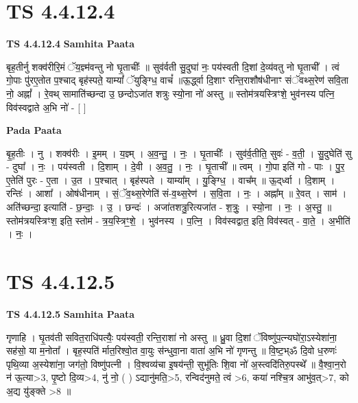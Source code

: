 \documentclass[17pt]{extarticle}
\begin{document}
\section*{ TS 4.4.12.4 }

\textbf{TS 4.4.12.4 } \newline
\textbf{Samhita Paata} \newline

बृह॒तीर्नु शक्व॑रीरि॒मं ॅय॒ज्ञ्म॑वन्तु नो घृ॒ताचीः᳚ ॥ सुव॑र्वती सु॒दुघा॑ नः॒ पय॑स्वती दि॒शां दे॒व्य॑वतु नो घृ॒ताची᳚ । त्वं गो॒पाः पु॑रए॒तोत प॒श्चाद् बृह॑स्पते॒ याम्यां᳚ ॅयुङ्ग्धि॒ वाचं᳚ ॥ऊ॒र्द्ध्वा दि॒शाꣳ रन्ति॒राशौष॑धीनाꣳ संॅवथ्स॒रेण॑ सवि॒ता नो॒ अह्नां᳚ । रे॒वथ् सामाति॑च्छन्दा उ॒ छन्दोऽजा॑त शत्रुः स्यो॒ना नो॑ अस्तु ॥ स्तोम॑त्रयस्त्रिꣳशे॒ भुव॑नस्य पत्नि॒ विव॑स्वद्वाते अ॒भि नो॑ - [  ] \newline

\textbf{Pada Paata} \newline

बृ॒ह॒तीः । नु । शक्व॑रीः । इ॒मम् । य॒ज्ञ्म् । अ॒व॒न्तु॒ । नः॒ । घृ॒ताचीः᳚ । सुव॑र्व॒तीति॒ सुवः॑ - व॒ती॒ । सु॒दुघेति॑ सु - दुघा᳚ । नः॒ । पय॑स्वती । दि॒शाम् । दे॒वी । अ॒व॒तु॒ । नः॒ । घृ॒ताची᳚ ॥ त्वम् । गो॒पा इति॑ गो - पाः । पु॒र॒ ए॒तेति॑ पुरः - ए॒ता । उ॒त । प॒श्चात् । बृह॑स्पते । याम्या᳚म् । यु॒ङ्ग्धि॒ । वाच᳚म् ॥ ऊ॒द्‌र्ध्वा । दि॒शाम् । रन्तिः॑ । आशा᳚ । ओष॑धीनाम् । सं॒ॅव॒थ्स॒रेणेति॑ सं-व॒थ्स॒रेण॑ । स॒वि॒ता । नः॒ । अह्ना᳚म् ॥ रे॒वत् । साम॑ । अति॑॑च्छन्दा॒ इत्याति॑ - छ॒न्दाः॒ । उ॒ । छन्दः॑ । अजा॑तशत्रु॒रित्यजा॑त - श॒त्रुः॒ । स्यो॒ना । नः॒ । अ॒स्तु॒ ॥ स्तोम॑त्रयस्त्रिꣳश॒ इति॒ स्तोम॑ - त्र॒य॒स्त्रिꣳ॒॒शे॒ । भुव॑नस्य । प॒त्नि॒ । विव॑स्वद्वात॒ इति॒ विव॑स्वत् - वा॒ते॒ । अ॒भीति॑ । नः॒ ।  \newline




\section*{ TS 4.4.12.5 }

\textbf{TS 4.4.12.5 } \newline
\textbf{Samhita Paata} \newline

गृणाहि । घृ॒तव॑ती सवित॒राधि॑पत्यैः॒ पय॑स्वती॒ रन्ति॒राशा॑ नो अस्तु ॥ ध्रु॒वा दि॒शां ॅविष्णु॑प॒त्न्यघो॑रा॒ऽस्येशा॑ना॒ सह॑सो॒ या म॒नोता᳚ । बृह॒स्पति॑ र्मात॒रिश्वो॒त वा॒युः स॑न्धुवा॒ना वाता॑ अ॒भि नो॑ गृणन्तु ॥ वि॒ष्ट॒भ्ॐ दि॒वो ध॒रुणः॑ पृथि॒व्या अ॒स्येशा॑ना॒ जग॑तो॒ विष्णु॑पत्नी । वि॒श्वव्य॑चा इ॒षय॑न्ती॒ सुभू॑तिः शि॒वा नो॑ अ॒स्त्वदि॑तिरु॒पस्थे᳚ ॥ वै॒श्वा॒न॒रो न॑ ऊ॒त्या>3, पृ॒ष्टो दि॒व्य>4, नु॑ नो॒ ( ) ऽद्यानु॑मति॒>5, रन्विद॑नुमते॒ त्वं >6, कया॑ नश्चि॒त्र आभु॑व॒त्>7, को अ॒द्य यु॑ङ्क्ते >8 ॥ \newline
\end{document}
